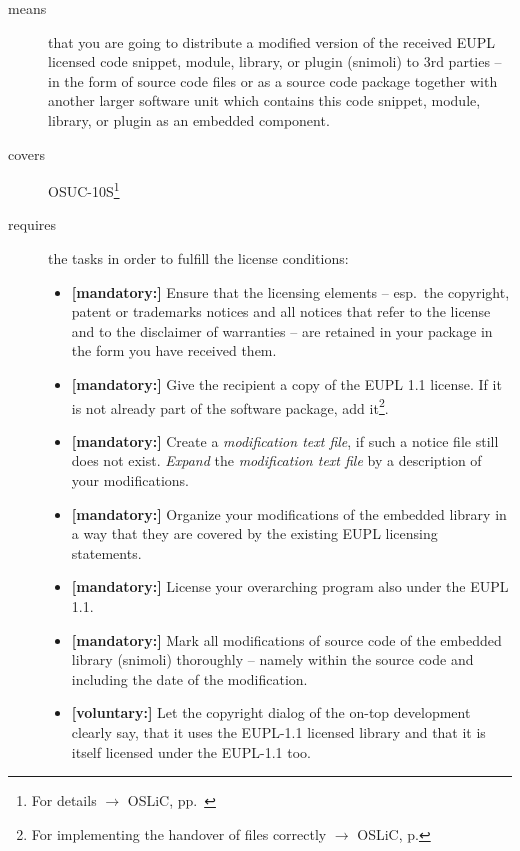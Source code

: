 \begin{description}
\item[means] that you are going to distribute a modified version of the received
EUPL licensed code snippet, module, library, or plugin (snimoli) to 3rd parties
-- in the form of source code files or as a source code package together with
another larger software unit which contains this code snippet, module, library,
or plugin as an embedded component.
\item[covers] OSUC-10S\footnote{For details $\rightarrow$ OSLiC, pp.\
\pageref{OSUC-10S-DEF}}
\item[requires] the tasks in order to fulfill the license conditions:
\begin{itemize}

  \item \textbf{[mandatory:]} Ensure that the licensing elements -- esp.\ the
  copyright, patent or trademarks notices and all notices that refer to the
  license and to the disclaimer of warranties -- are retained in your package in
  the form you have received them.

  \item \textbf{[mandatory:]} Give the recipient a copy of the EUPL 1.1
  license. If it is not already part of the software package, add
  it\footnote{For implementing the handover of files correctly $\rightarrow$
  OSLiC, p. \pageref{DistributingFilesHint}}.

  \item \textbf{[mandatory:]} Create a \emph{modification text file}, if such a
  notice file still does not exist. \emph{Expand} the \emph{modification text
  file} by a description of your modifications.
  
  \item \textbf{[mandatory:]} Organize your modifications of the embedded
  library in a way that they are covered by the existing EUPL licensing
  statements. 
  
  \item \textbf{[mandatory:]} License your overarching program also under the
  EUPL 1.1.
  
  \item \textbf{[mandatory:]} Mark all modifications of source code of the
  embedded library (snimoli) thoroughly --
  namely within the source code and including the date of the modification.
  
  \item \textbf{[voluntary:]} Let the copyright dialog of the on-top development
  clearly say, that it uses the EUPL-1.1 licensed library and that it is itself
  licensed under the EUPL-1.1 too.
  

\end{itemize}
\end{description}
